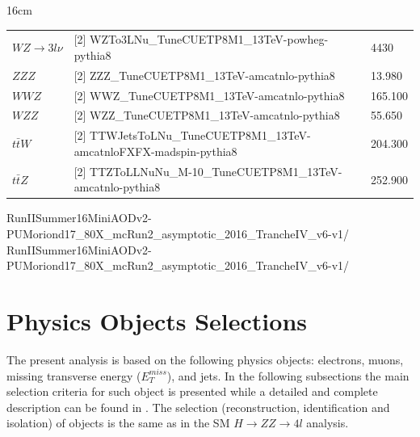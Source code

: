 \begin{landscape}
\begin{table}[hbtp]{16cm}
\begin{tabular}{l|l|l}
		$WZ \rightarrow 3l\nu$ & [2] WZTo3LNu\_TuneCUETP8M1\_13TeV-powheg-pythia8 & 4430\\
		$ZZZ$ & [2] ZZZ\_TuneCUETP8M1\_13TeV-amcatnlo-pythia8 & 13.980\\
		$WWZ$ & [2] WWZ\_TuneCUETP8M1\_13TeV-amcatnlo-pythia8 & 165.100\\
		$WZZ$ & [2] WZZ\_TuneCUETP8M1\_13TeV-amcatnlo-pythia8 & 55.650\\
		$t\bar{t}W$ & [2] TTWJetsToLNu\_TuneCUETP8M1\_13TeV-amcatnloFXFX-madspin-pythia8 & 204.300\\
		$t\bar{t}Z$ & [2] TTZToLLNuNu\_M-10\_TuneCUETP8M1\_13TeV-amcatnlo-pythia8 & 252.900\\
		\hline
	\end{tabular}
	\begin{flushleft}
		[1] RunIISummer16MiniAODv2-PUMoriond17\_80X\_mcRun2\_asymptotic\_2016\_TrancheIV\_v6-v1/
		\newline
		[2] RunIISummer16MiniAODv2-PUMoriond17\_80X\_mcRun2\_asymptotic\_2016\_TrancheIV\_v6-v1/		
	\end{flushleft}
	\label{tab:simulated_samples_list}
\end{table}
\end{landscape}

\chapter{Physics Objects Selections}
\label{sec:physics_objects_selections}
The present analysis is based on the following physics objects: electrons, muons, missing transverse energy ($E_{T}^{miss}$), and jets. In the following subsections the main selection criteria for such object is presented while a detailed and complete description can be found in \cite{bib:CMS-AN-16-442,bib:CMS-AN-16-217}. The selection (reconstruction, identification and isolation) of objects is the same as in the SM $H \rightarrow ZZ \rightarrow 4l$ analysis.

